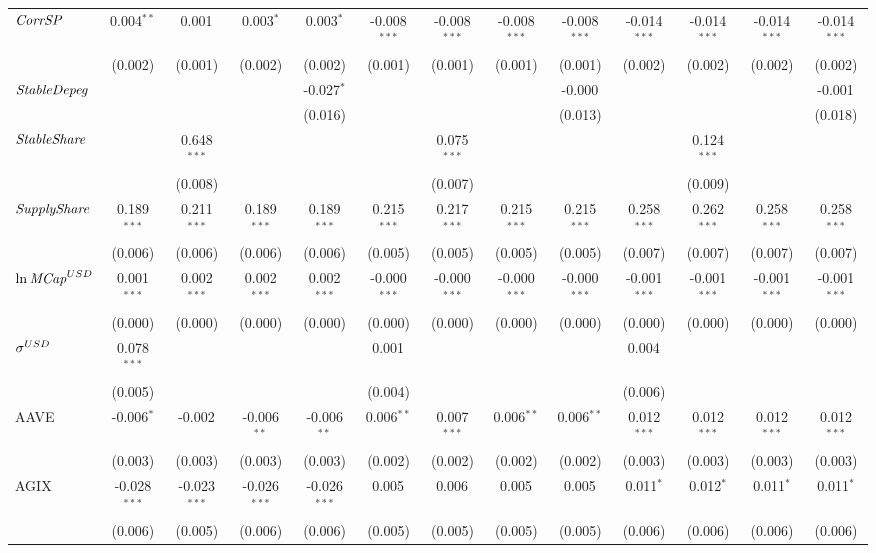 \begin{table}[!htbp]
\begin{tabular}{@{\extracolsep{5pt}}lcccccccccccc}
 ${\it CorrSP}$ & 0.004$^{**}$ & 0.001$^{}$ & 0.003$^{*}$ & 0.003$^{*}$ & -0.008$^{***}$ & -0.008$^{***}$ & -0.008$^{***}$ & -0.008$^{***}$ & -0.014$^{***}$ & -0.014$^{***}$ & -0.014$^{***}$ & -0.014$^{***}$ \\
  & (0.002) & (0.001) & (0.002) & (0.002) & (0.001) & (0.001) & (0.001) & (0.001) & (0.002) & (0.002) & (0.002) & (0.002) \\
 ${\it StableDepeg}$ & & & & -0.027$^{*}$ & & & & -0.000$^{}$ & & & & -0.001$^{}$ \\
  & & & & (0.016) & & & & (0.013) & & & & (0.018) \\
 ${\it StableShare}$ & & 0.648$^{***}$ & & & & 0.075$^{***}$ & & & & 0.124$^{***}$ & & \\
  & & (0.008) & & & & (0.007) & & & & (0.009) & & \\
 ${\it SupplyShare}$ & 0.189$^{***}$ & 0.211$^{***}$ & 0.189$^{***}$ & 0.189$^{***}$ & 0.215$^{***}$ & 0.217$^{***}$ & 0.215$^{***}$ & 0.215$^{***}$ & 0.258$^{***}$ & 0.262$^{***}$ & 0.258$^{***}$ & 0.258$^{***}$ \\
  & (0.006) & (0.006) & (0.006) & (0.006) & (0.005) & (0.005) & (0.005) & (0.005) & (0.007) & (0.007) & (0.007) & (0.007) \\
 ${\it \ln MCap}^{USD}$ & 0.001$^{***}$ & 0.002$^{***}$ & 0.002$^{***}$ & 0.002$^{***}$ & -0.000$^{***}$ & -0.000$^{***}$ & -0.000$^{***}$ & -0.000$^{***}$ & -0.001$^{***}$ & -0.001$^{***}$ & -0.001$^{***}$ & -0.001$^{***}$ \\
  & (0.000) & (0.000) & (0.000) & (0.000) & (0.000) & (0.000) & (0.000) & (0.000) & (0.000) & (0.000) & (0.000) & (0.000) \\
 ${\it \sigma}^{USD}$ & 0.078$^{***}$ & & & & 0.001$^{}$ & & & & 0.004$^{}$ & & & \\
  & (0.005) & & & & (0.004) & & & & (0.006) & & & \\
 AAVE & -0.006$^{*}$ & -0.002$^{}$ & -0.006$^{**}$ & -0.006$^{**}$ & 0.006$^{**}$ & 0.007$^{***}$ & 0.006$^{**}$ & 0.006$^{**}$ & 0.012$^{***}$ & 0.012$^{***}$ & 0.012$^{***}$ & 0.012$^{***}$ \\
  & (0.003) & (0.003) & (0.003) & (0.003) & (0.002) & (0.002) & (0.002) & (0.002) & (0.003) & (0.003) & (0.003) & (0.003) \\
 AGIX & -0.028$^{***}$ & -0.023$^{***}$ & -0.026$^{***}$ & -0.026$^{***}$ & 0.005$^{}$ & 0.006$^{}$ & 0.005$^{}$ & 0.005$^{}$ & 0.011$^{*}$ & 0.012$^{*}$ & 0.011$^{*}$ & 0.011$^{*}$ \\
  & (0.006) & (0.005) & (0.006) & (0.006) & (0.005) & (0.005) & (0.005) & (0.005) & (0.006) & (0.006) & (0.006) & (0.006) \\

\end{tabular}
\end{table}

